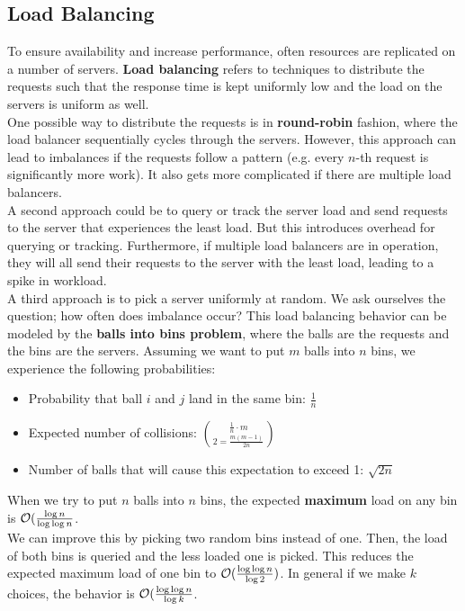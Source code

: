 \subsection{Load Balancing}
To ensure availability and increase performance, often resources are replicated on a number of servers. \textbf{Load balancing} refers to techniques to distribute the requests such that the response time is kept uniformly low and the load on the servers is uniform as well.\\
One possible way to distribute the requests is in \textbf{round-robin} fashion, where the load balancer sequentially cycles through the servers. However, this approach can lead to imbalances if the requests follow a pattern (e.g. every $n$-th request is significantly more work). It also gets more complicated if there are multiple load balancers.\\
A second approach could be to query or track the server load and send requests to the server that experiences the least load. But this introduces overhead for querying or tracking. Furthermore, if multiple load balancers are in operation, they will all send their requests to the server with the least load, leading to a spike in workload.\vspace{.3cm}\\

A third approach is to pick a server uniformly at random. We ask ourselves the question; how often does imbalance occur? This load balancing behavior can be modeled by the \textbf{balls into bins problem}, where the balls are the requests and the bins are the servers. Assuming we want to put $m$ balls into $n$ bins, we experience the following probabilities:
\begin{itemize}
\item Probability that ball $i$ and $j$ land in the same bin: $\frac{1}{n}$
\item Expected number of collisions: $\frac{1}{n} \cdot m \choose 2 = \frac{m(m-1)}{2n}$
\item Number of balls that will cause this expectation to exceed 1: $\sqrt{2n}$
\end{itemize}
When we try to put $n$ balls into $n$ bins, the expected \textbf{maximum} load on any bin is $\mathcal{O} (\frac{\log n}{\log \log n}$.\\
We can improve this by picking two random bins instead of one. Then, the load of both bins is queried and the less loaded one is picked. This reduces the expected maximum load of one bin to $\mathcal{O} ( \frac{\log \log n}{\log 2})$. In general if we make $k$ choices, the behavior is $\mathcal{O} (\frac{\log \log n}{\log k}$. \vspace{.3cm}\\

